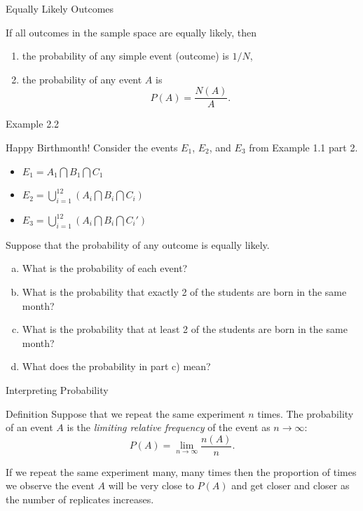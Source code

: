 \documentclass[aspectratio=169,xcolor=pdftex,dvipsnames,table]{beamer}\usepackage[]{graphicx}\usepackage[]{xcolor}
\begin{document}
\begin{frame}{Equally Likely Outcomes}

  If all outcomes in the sample space are equally likely, then 
\begin{enumerate}  
  \item the probability of any simple event (outcome) is $1/N$, 
  \item the probability of any event $A$ is
  \[
    P(A)=\frac{N(A)}{A}.
  \]
  \end{enumerate}
  
\end{frame}

\begin{frame}{Example 2.2}
  \begin{block}{Happy Birthmonth!}
    Consider the events $E_1$, $E_2$, and $E_3$ from Example 1.1 part 2. 
    \medskip

    \begin{itemize}
    \item $E_1=A_1 \bigcap B_1 \bigcap C_1$
    \item $E_2=\bigcup_{i=1}^{12} (A_i \bigcap B_i \bigcap C_i)$
    \item $E_3=\bigcup_{i=1}^{12} (A_i \bigcap B_i \bigcap C_i')$
    \end{itemize}

    \medskip
    Suppose that the probability of any outcome is equally likely. 
    \begin{enumerate}[a)]
    \item What is the probability of each event?
    \item What is the probability that exactly 2 of the students are born in the same month?
    \item What is the probability that at least 2 of the students are born in the same month?
    \item What does the probability in part c) mean?
    \end{enumerate}
  \end{block}
\end{frame}

\begin{frame}{Interpreting Probability}

  \begin{block}{Definition}
    Suppose that we repeat the same experiment $n$ times. The probability of an event $A$ is the \textit{limiting relative frequency} of the event as $n \to \infty$:
    \[
      P(A)=\lim_{n \to \infty} \frac{n(A)}{n}.
    \]

    \bigskip

    \begin{center}
      If we repeat the same experiment many, many times then the proportion of times we observe the event $A$ will be very close to $P(A)$ and get closer and closer as the number of replicates increases. 
    \end{center}
    
  \end{block}
\end{frame}
\end{document}

